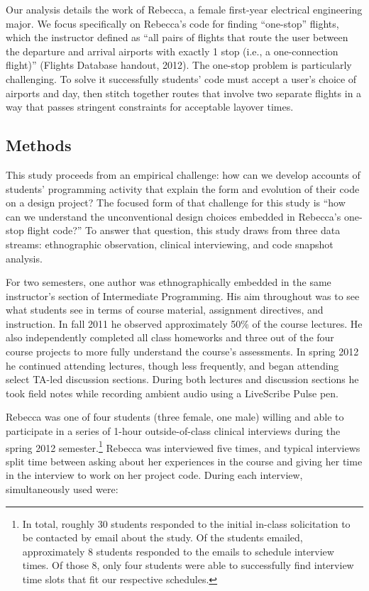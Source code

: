Our analysis details the work of Rebecca, a female first-year electrical
engineering major. We focus specifically on Rebecca's code for finding
``one-stop'' flights, which the instructor defined as ``all pairs of
flights that route the user between the departure and arrival airports
with exactly 1 stop (i.e., a one-connection flight)'' (Flights Database
handout, 2012). The one-stop problem is particularly challenging. To
solve it successfully students' code must accept a user's choice of
airports and day, then stitch together routes that involve two separate
flights in a way that passes stringent constraints for acceptable
layover times.

\subsection{Methods}\label{methods}

This study proceeds from an empirical challenge: how can we develop
accounts of students' programming activity that explain the form and
evolution of their code on a design project? The focused form of that
challenge for this study is ``how can we understand the unconventional
design choices embedded in Rebecca's one-stop flight code?'' To answer
that question, this study draws from three data streams: ethnographic
observation, clinical interviewing, and code snapshot analysis.

For two semesters, one author was ethnographically embedded in the same
instructor's section of Intermediate Programming. His aim throughout was
to see what students see in terms of course material, assignment
directives, and instruction. In fall 2011 he observed approximately 50\%
of the course lectures. He also independently completed all class
homeworks and three out of the four course projects to more fully
understand the course's assessments. In spring 2012 he continued
attending lectures, though less frequently, and began attending select
TA-led discussion sections. During both lectures and discussion sections
he took field notes while recording ambient audio using a LiveScribe
Pulse pen.

Rebecca was one of four students (three female, one male) willing and
able to participate in a series of 1-hour outside-of-class clinical
interviews during the spring 2012 semester.\footnote{In total, roughly
  30 students responded to the initial in-class solicitation to be
  contacted by email about the study. Of the students emailed,
  approximately 8 students responded to the emails to schedule interview
  times. Of those 8, only four students were able to successfully find
  interview time slots that fit our respective schedules.} Rebecca was interviewed
 five times, and typical interviews split time between
asking about her experiences in the course and giving her time in the
interview to work on her project code. During each interview,
simultaneously used were:

